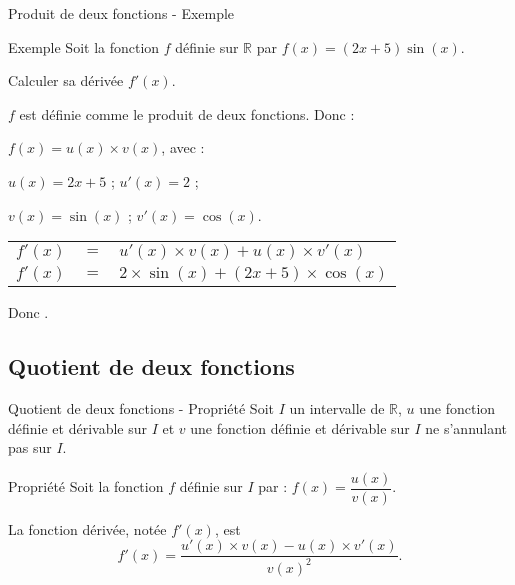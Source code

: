 \documentclass[12pt]{beamer}
\begin{document}
\begin{frame}{Produit de deux fonctions - Exemple}
\begin{block}{Exemple}
Soit la fonction $f$ définie sur $\mathbb{R}$ par $f(x) = (2x+5)\sin(x)$. \par 
Calculer sa dérivée $f'(x)$.
\end{block}

\medskip

$f$ est définie comme le produit de deux fonctions. Donc :

\medskip

$f(x) = u(x) \times v(x)$, avec : 

\medskip

\begin{flushleft}
$u(x) = 2x+5$ ; \hspace{0.5cm} $u'(x) = 2$ ; \par
$v(x) = \sin(x)$ ; \hspace{0.5cm} $v'(x) = \cos(x)$.
\end{flushleft}

\medskip

\begin{tabular}{rcl}
$f'(x)$ & $=$ & $u'(x) \times v(x) + u(x) \times v'(x)$ \\
$f'(x)$ & $=$ & $2 \times \sin(x) + (2x+5) \times \cos(x)$
\end{tabular}

\medskip

Donc .

\end{frame}

\subsection{Quotient de deux fonctions}

\begin{frame}{Quotient de deux fonctions - Propriété}
Soit $I$ un intervalle de $\mathbb{R}$, $u$ une fonction définie et dérivable sur $I$ et $v$ une fonction définie et dérivable sur $I$ ne s'annulant pas sur $I$.

\medskip

\begin{exampleblock}{Propriété}
Soit la fonction $f$ définie sur $I$ par : $f(x) = \dfrac{u(x)}{v(x)}$. \par 
La fonction dérivée, notée $f'(x)$, est \[ f'(x) = \dfrac{u'(x) \times v(x) - u(x) \times v'(x)}{v(x)^2}. \]
\end{exampleblock}
\end{frame}
\end{document}
